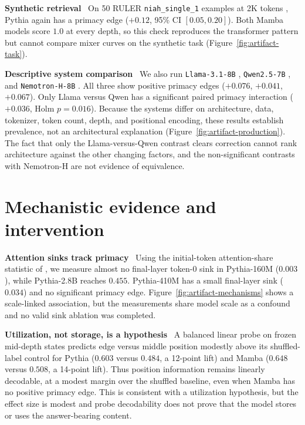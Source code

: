 \documentclass{article}
\newcommand{\runin}[1]{\par\medskip\noindent\textbf{#1}\ }
\begin{document}
\runin{Synthetic retrieval}
On 50 RULER \texttt{niah\_single\_1} examples at 2K tokens \citep{hsieh2024ruler}, Pythia again has a primacy edge ($+0.12$, 95\% CI $[0.05,0.20]$).
Both Mamba models score $1.0$ at every depth, so this check reproduces the transformer pattern but cannot compare mixer curves on the synthetic task (Figure~\ref{fig:artifact-task}).

\runin{Descriptive system comparison}
We also run \texttt{Llama-3.1-8B} \citep{dubey2024llama}, \texttt{Qwen2.5-7B} \citep{yang2024qwen2}, and \texttt{Nemotron-H-8B} \citep{nvidia2025nemotronh}.
All three show positive primacy edges ($+0.076$, $+0.041$, $+0.067$).
Only Llama versus Qwen has a significant paired primacy interaction ($+0.036$, Holm $p=0.016$).
Because the systems differ on architecture, data, tokenizer, token count, depth, and positional encoding, these results establish prevalence, not an architectural explanation (Figure~\ref{fig:artifact-production}).
The fact that only the Llama-versus-Qwen contrast clears correction cannot rank architecture against the other changing factors, and the non-significant contrasts with Nemotron-H are not evidence of equivalence.

\section{Mechanistic evidence and intervention}
\label{sec:mechanism}

\runin{Attention sinks track primacy}
Using the initial-token attention-share statistic of \citet{xiao2024efficient}, we measure almost no final-layer token-0 sink in Pythia-160M ($0.003$), while Pythia-2.8B reaches $0.455$.
Pythia-410M has a small final-layer sink ($0.034$) and no significant primacy edge.
Figure~\ref{fig:artifact-mechanisms} shows a scale-linked association, but the measurements share model scale as a confound and no valid sink ablation was completed.

\runin{Utilization, not storage, is a hypothesis}
A balanced linear probe on frozen mid-depth states predicts edge versus middle position modestly above its shuffled-label control for Pythia ($0.603$ versus $0.484$, a 12-point lift) and Mamba ($0.648$ versus $0.508$, a 14-point lift).
Thus position information remains linearly decodable, at a modest margin over the shuffled baseline, even when Mamba has no positive primacy edge.
This is consistent with a utilization hypothesis, but the effect size is modest and probe decodability does not prove that the model stores or uses the answer-bearing content.
\end{document}
